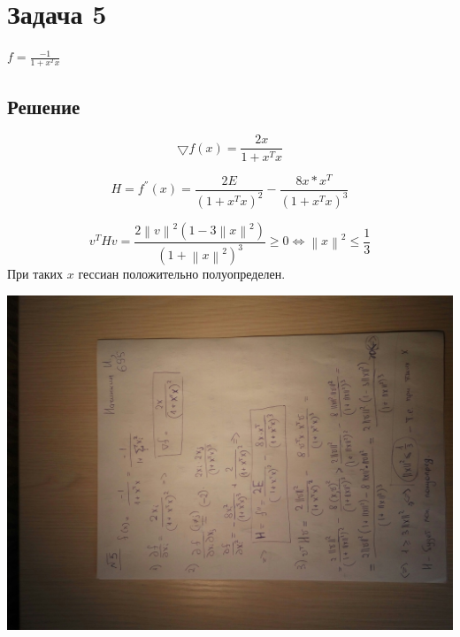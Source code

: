 \documentclass[a4paper]{article}
\newcommand{\norm}[1]{\left\lVert#1\right\rVert}
\begin{document}
\section*{Задача 5}
$f = \frac{-1}{1+x^{T}x}$
\subsection*{Решение}
\begin{equation*}
\bigtriangledown{f}(x) = \frac{2x}{1+x^{T}x}
\end{equation*}

\begin{equation*}
H = f^{''}(x) =  \frac{2E}{(1+x^{T}x)^2} - \frac{8x*x^{T}}{(1+x^{T}x)^3}
\end{equation*}

\begin{equation*}
v^{T}Hv = \frac{2\norm v ^{2}(1 - 3 \norm x ^{2})}{(1 + \norm x ^{2})^{3}} \geq 0
\Longleftrightarrow \norm x ^{2} \leq \frac{1}{3}
\end{equation*}
При таких $x$ гессиан положительно полуопределен.

\includegraphics[scale=0.3, angle=270]{five}
\end{document}
